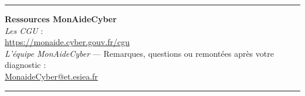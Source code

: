 \documentclass[11pt,a4paper]{article}
\newcommand{\sectionruleline}{%
	\vspace{0.3em}
	\textcolor{sectionrule}{\rule{\linewidth}{0.8pt}}
	\vspace{0.3em}
}
\begin{document}
\begin{tcolorbox}
		\vspace{3pt}\sectionruleline
		
		\textbf{\faBook\enskip Ressources MonAideCyber}\\
		\textit{Les CGU} :\\
		\href{https://monaide.cyber.gouv.fr/cgu}{https://monaide.cyber.gouv.fr/cgu}\\[0.2em]
		\textit{L'équipe MonAideCyber} — Remarques, questions ou remontées après votre diagnostic :\\
		\href{mailto:MonaideCyber@et.esiea.fr}{MonaideCyber@et.esiea.fr}
		\par\noindent\textcolor{esieadarkblue}{\rule{\linewidth}{0.8pt}}\par

	\end{tcolorbox}
	
\end{document}
